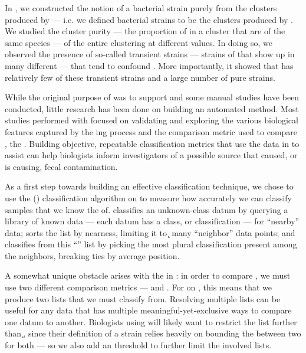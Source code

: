 In \cite{DBLP:conf/bcb/McGovernJDBKV16}, we constructed the notion of a bacterial strain purely from the clusters produced by \dbscan{} --- i.e. we defined bacterial strains to be the clusters produced by \dbscan{}.
We studied the cluster purity --- the proportion of \isols{} in a cluster that are of the same species --- of the entire clustering at different \minneigh{} values.
In doing so, we observed the presence of so-called transient \ecoli{} strains --- strains of \ecoli{} that show up in many different \spec{} --- that tend to confound \mst{}.
More importantly, it showed that \cplop{} has relatively few of these transient strains and a large number of pure strains.

While the original purpose of \cplop{} was to support \mst{} and some manual \mst{} studies have been conducted, little research has been done on building an automated \mst{} method.
Most studies performed with \cplop{} focused on validating and exploring the various biological features captured by the \pyro{}ing process and the comparison metric used to compare \pyros{}, the \pearson{}.
Building objective, repeatable classification metrics that use the data in \cplop{} to assist \mst{} can help biologists inform investigators of a possible source that caused, or is causing, fecal contamination.


As a first step towards building an effective classification technique, we chose to use the \kNNlong{} (\kNN) classification algorithm on \cplop{} to measure how accurately we can classify samples that we know the \spec{} of.
\kNN{} classifies an unknown-class datum by querying a library of known data --- each datum has a class, or classification --- for ``nearby'' data; sorts the list by nearness, limiting it to \k{} many ``neighbor'' data points; and classifies from this ``\knnlong{}'' list by picking the most plural classification present among the neighbors, breaking ties by average position.

A somewhat unique obstacle arises with the \ecoli{} \isols{} in \cplop{}: in order to compare \isols{}, we must use two different comparison metrics --- \pcsixt{} and \pcfive{}.
For \kNN{} on \cplop{} \ecoli{} \isols{}, this means that we produce two \knnlong{} lists that we must classify from.
Resolving multiple \kNN{} lists can be useful for any data that has multiple meaningful-yet-exclusive ways to compare one datum to another.
Biologists using \kNN{} will likely want to restrict the list further than \k{}, since their definition of a strain relies heavily on bounding the \pearson{} between two \isols{} for both \itsshort{} --- so we also add an \a{} threshold to further limit the involved \kNN{} lists.


